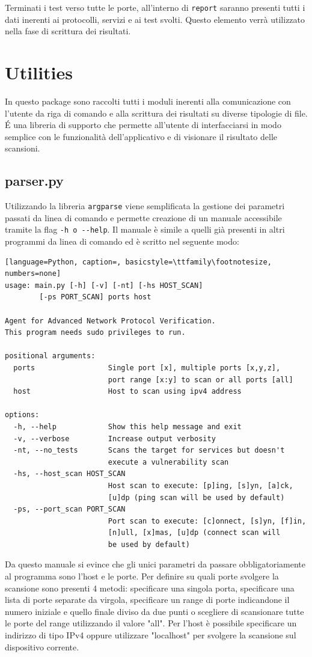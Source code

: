 \documentclass[12pt]{report}
\begin{document}
Terminati i test verso tutte le porte, all'interno di \lstinline{report} saranno presenti tutti i dati inerenti ai protocolli, servizi e ai test svolti. Questo elemento verrà utilizzato nella fase di scrittura dei risultati.

\section{Utilities}

In questo package sono raccolti tutti i moduli inerenti alla comunicazione con l'utente da riga di comando e alla scrittura dei risultati su diverse tipologie di file. \'{E} una libreria di supporto che permette all'utente di interfacciarsi in modo semplice con le funzionalità dell'applicativo e di visionare il risultato delle scansioni.

\subsection{parser.py}

Utilizzando la libreria \lstinline{argparse} viene semplificata la gestione dei parametri passati da linea di comando e permette creazione di un manuale accessibile tramite la flag \lstinline{-h o --help}.  
Il manuale è simile a quelli già presenti in altri programmi da linea di comando ed è scritto nel seguente modo:
\begin{lstlisting}[language=Python, caption=, basicstyle=\ttfamily\footnotesize, numbers=none]
usage: main.py [-h] [-v] [-nt] [-hs HOST_SCAN] 
        [-ps PORT_SCAN] ports host

Agent for Advanced Network Protocol Verification. 
This program needs sudo privileges to run.

positional arguments:
  ports                 Single port [x], multiple ports [x,y,z], 
                        port range [x:y] to scan or all ports [all]
  host                  Host to scan using ipv4 address

options:
  -h, --help            Show this help message and exit
  -v, --verbose         Increase output verbosity
  -nt, --no_tests       Scans the target for services but doesn't 
                        execute a vulnerability scan
  -hs, --host_scan HOST_SCAN
                        Host scan to execute: [p]ing, [s]yn, [a]ck, 
                        [u]dp (ping scan will be used by default)
  -ps, --port_scan PORT_SCAN
                        Port scan to execute: [c]onnect, [s]yn, [f]in, 
                        [n]ull, [x]mas, [u]dp (connect scan will 
                        be used by default)
\end{lstlisting}
Da questo manuale si evince che gli unici parametri da passare obbligatoriamente al programma sono l'host e le porte. Per definire su quali porte svolgere la scansione sono presenti 4 metodi: specificare una singola porta, specificare una lista di porte separate da virgola, specificare un range di porte indicandone il numero iniziale e quello finale diviso da due punti o scegliere di scansionare tutte le porte del range utilizzando il valore "all". Per l'host è possibile specificare un indirizzo di tipo IPv4 oppure utilizzare "localhost" per svolgere la scansione sul dispositivo corrente.
\end{document}
